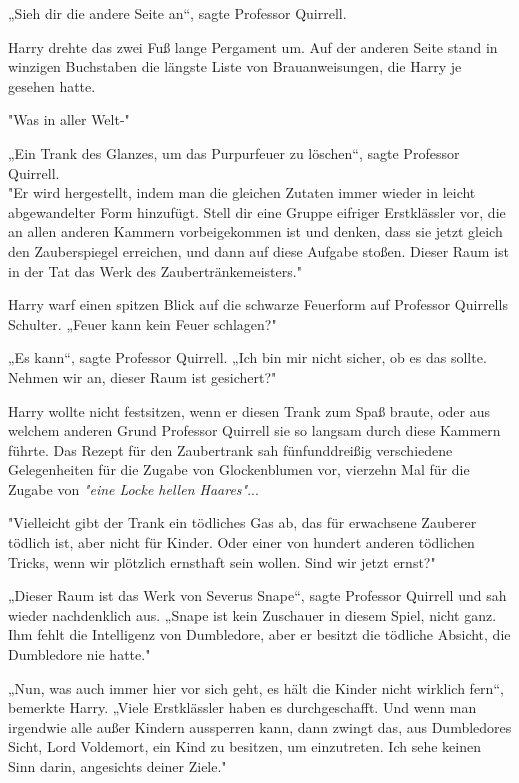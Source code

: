 {„Sieh dir die andere Seite an“, sagte Professor Quirrell.

Harry drehte das zwei Fuß lange Pergament um. Auf der anderen Seite stand in winzigen Buchstaben die längste Liste von Brauanweisungen, die Harry je gesehen hatte.

"Was in aller Welt-"

„Ein Trank des Glanzes, um das Purpurfeuer zu löschen“, sagte Professor Quirrell.\\ "Er wird hergestellt, indem man die gleichen Zutaten immer wieder in leicht abgewandelter Form hinzufügt. Stell dir eine Gruppe eifriger Erstklässler vor, die an allen anderen Kammern vorbeigekommen ist und denken, dass sie jetzt gleich den Zauberspiegel erreichen, und dann auf diese Aufgabe stoßen. Dieser Raum ist in der Tat das Werk des Zaubertränkemeisters."

Harry warf einen spitzen Blick auf die schwarze Feuerform auf Professor Quirrells Schulter. „Feuer kann kein Feuer schlagen?"

„Es kann“, sagte Professor Quirrell. „Ich bin mir nicht sicher, ob es das sollte.\\ Nehmen wir an, dieser Raum ist gesichert?"

Harry wollte nicht festsitzen, wenn er diesen Trank zum Spaß braute, oder aus welchem anderen Grund Professor Quirrell sie so langsam durch diese Kammern führte. Das Rezept für den Zaubertrank sah fünfunddreißig verschiedene Gelegenheiten für die Zugabe von Glockenblumen vor, vierzehn Mal für die Zugabe von \emph{"eine Locke hellen Haares"}...

"Vielleicht gibt der Trank ein tödliches Gas ab, das für erwachsene Zauberer tödlich ist, aber nicht für Kinder. Oder einer von hundert anderen tödlichen Tricks, wenn wir plötzlich ernsthaft sein wollen. Sind wir jetzt ernst?"

„Dieser Raum ist das Werk von Severus Snape“, sagte Professor Quirrell und sah wieder nachdenklich aus. „Snape ist kein Zuschauer in diesem Spiel, nicht ganz. Ihm fehlt die Intelligenz von Dumbledore, aber er besitzt die tödliche Absicht, die Dumbledore nie hatte."

„Nun, was auch immer hier vor sich geht, es hält die Kinder nicht wirklich fern“, bemerkte Harry. „Viele Erstklässler haben es durchgeschafft. Und wenn man irgendwie alle außer Kindern aussperren kann, dann zwingt das, aus Dumbledores Sicht, Lord Voldemort, ein Kind zu besitzen, um einzutreten. Ich sehe keinen Sinn darin, angesichts deiner Ziele."

}
